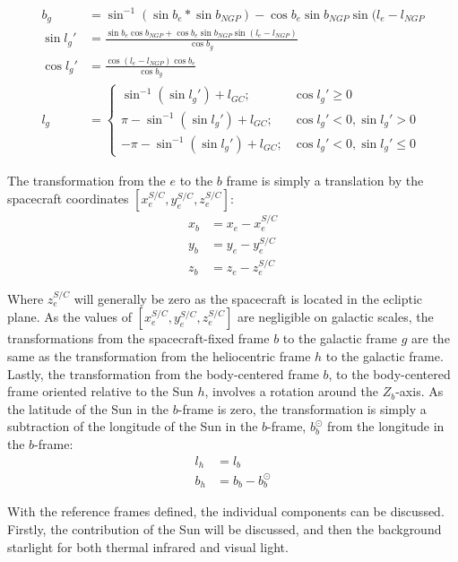 \begin{align}
 b_g &= \sin ^{-1} (\sin b_e * \sin b_{NGP}) - \cos b_e \sin b_{NGP} \sin (l_e - l_{NGP} \\
 \sin l_g' &= \frac{\sin b_e \cos b_{NGP} + \cos b_e \sin b_{NGP} \sin (l_e - l_{NGP})}{\cos b_g} \\
 \cos l_g' &= \frac{\cos (l_e - l_{NGP}) \cos b_e}{\cos b_g} \\
 l_g &= \begin{cases}
        \sin ^{-1} (\sin l_g') + l_{GC}; & \cos l_g' \geq 0 \\
        \pi - \sin^{-1} (\sin l_g') + l_{GC}; & \cos l_g' < 0, \sin l_g' > 0 \\
        - \pi - \sin^{-1} (\sin l_g') + l_{GC}; & \cos l_g' < 0, \sin l_g' \leq 0
       \end{cases}
\end{align}

The transformation from the $e$ to the $b$ frame is simply a translation by the spacecraft coordinates $[x_e^{S/C}, y_e^{S/C}, z_e^{S/C}]$:
\begin{align}
 x_b &= x_e - x_e^{S/C} \\
 y_b &= y_e - y_e^{S/C} \\
 z_b &= z_e - z_e^{S/C}
\end{align}

Where $z_e^{S/C}$ will generally be zero as the spacecraft is located in the ecliptic plane. As the values of $[x_e^{S/C}, y_e^{S/C}, z_e^{S/C}]$ are negligible on galactic scales, the transformations from the spacecraft-fixed frame $b$ to the galactic frame $g$ are the same as the transformation from the heliocentric frame $h$ to the galactic frame. Lastly, the transformation from the body-centered frame $b$, to the body-centered frame oriented relative to the Sun $h$, involves a rotation around the $Z_b$-axis. As the latitude of the Sun in the $b$-frame is zero, the transformation is simply a subtraction of the longitude of the Sun in the $b$-frame, $b_b^{\odot}$ from the longitude in the $b$-frame:
\begin{align}
 l_h &= l_b \\
 b_h &= b_b - b_b^{\odot}
\end{align}

With the reference frames defined, the individual components can be discussed. Firstly, the contribution of the Sun will be discussed, and then the background starlight for both thermal infrared and visual light.

